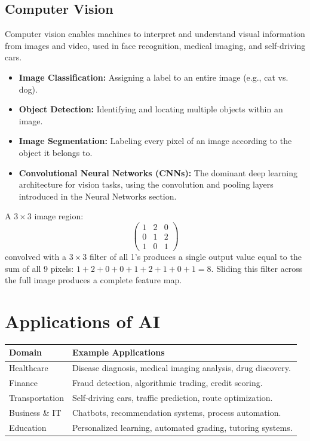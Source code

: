 \documentclass[11pt,a4paper]{article}
\begin{document}
\subsection{Computer Vision}
\begin{definitionbox}
Computer vision enables machines to interpret and understand visual information from images and video, used in face recognition, medical imaging, and self-driving cars.
\end{definitionbox}
\begin{itemize}[leftmargin=*]
  \item \textbf{Image Classification:} Assigning a label to an entire image (e.g., cat vs. dog).
  \item \textbf{Object Detection:} Identifying and locating multiple objects within an image.
  \item \textbf{Image Segmentation:} Labeling every pixel of an image according to the object it belongs to.
  \item \textbf{Convolutional Neural Networks (CNNs):} The dominant deep learning architecture for vision tasks, using the convolution and pooling layers introduced in the Neural Networks section.
\end{itemize}

\begin{examplebox}
A $3\times3$ image region:
$$
\begin{pmatrix}1 & 2 & 0\\ 0 & 1 & 2\\ 1 & 0 & 1\end{pmatrix}
$$
convolved with a $3\times3$ filter of all 1's produces a single output value equal to the sum of all 9 pixels: $1+2+0+0+1+2+1+0+1=8$. Sliding this filter across the full image produces a complete feature map.
\end{examplebox}

\section{Applications of AI}

\begin{longtable}{@{}p{3.5cm}p{10cm}@{}}
\toprule
\rowcolor{primary!15}
\textbf{Domain} & \textbf{Example Applications} \\
\midrule
\endhead
Healthcare & Disease diagnosis, medical imaging analysis, drug discovery. \\
\addlinespace
Finance & Fraud detection, algorithmic trading, credit scoring. \\
\addlinespace
Transportation & Self-driving cars, traffic prediction, route optimization. \\
\addlinespace
Business \& IT & Chatbots, recommendation systems, process automation. \\
\addlinespace
Education & Personalized learning, automated grading, tutoring systems. \\
\bottomrule
\end{longtable}
\end{document}
